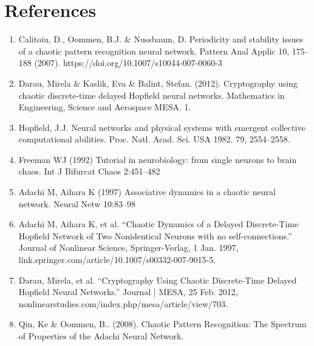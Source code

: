 \documentclass[12pt, letterpaper]{article}
\begin{document}
\section*{References}

\fontsize{8}{12}\selectfont

\begin{enumerate}[leftmargin=*]
    \item Calitoiu, D., Oommen, B.J. \& Nussbaum, D. Periodicity and stability issues of a chaotic pattern recognition neural network. Pattern Anal Applic 10, 175–188 (2007). https://doi.org/10.1007/s10044-007-0060-3
    \item Darau, Mirela \& Kaslik, Eva \& Balint, Stefan. (2012). Cryptography using chaotic discrete-time delayed Hopfield neural networks. Mathematics in Engineering, Science and Aerospace MESA. 1.
    \item Hopfield, J.J. Neural networks and physical systems with emergent collective computational abilities.
    Proc. Natl. Acad. Sci. USA 1982. 79, 2554–2558.
    \item Freeman WJ (1992) Tutorial in neurobiology: from single neurons to brain chaos. Int J Bifurcat Chaos 2:451–482
    \item Adachi M, Aihara K (1997) Associative dynamics in a chaotic neural network. Neural Netw 10:83–98
    \item Adachi M, Aihara K, et al. “Chaotic Dynamics of a Delayed Discrete-Time Hopfield Network of Two Nonidentical Neurons with no self-connections.” Journal of Nonlinear Science, Springer-Verlag, 1 Jan. 1997, link.springer.com/article/10.1007/s00332-007-9015-5.
    \item Darau, Mirela, et al. “Cryptography Using Chaotic Discrete-Time Delayed Hopfield Neural Networks.” Journal | MESA, 25 Feb. 2012, nonlinearstudies.com/index.php/mesa/article/view/703.
    \item Qin, Ke \& Oommen, B.. (2008). Chaotic Pattern Recognition: The Spectrum of Properties of the Adachi Neural Network.
\end{enumerate}
\end{document}
